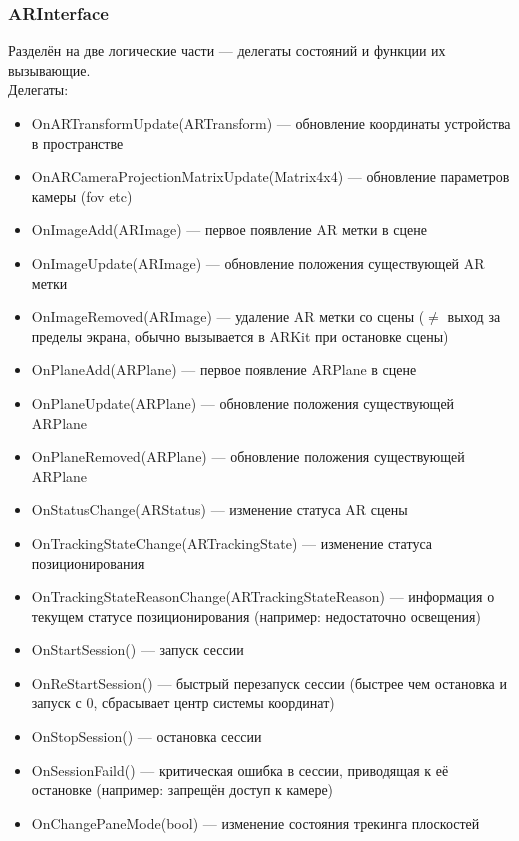 \documentclass[a4paper, 11pt, titlepage]{article}
\begin{document}
      \subsubsection{ARInterface}
        Разделён на две логические части --- делегаты состояний и функции их вызывающие. \\
        Делегаты:
        \begin{itemize}
          \item OnARTransformUpdate(ARTransform) --- обновление координаты устройства в пространстве
          \item OnARCameraProjectionMatrixUpdate(Matrix4x4) --- обновление параметров камеры (fov etc)
          \item OnImageAdd(ARImage) --- первое появление AR метки в сцене 
          \item OnImageUpdate(ARImage) --- обновление положения существующей AR метки
          \item OnImageRemoved(ARImage) --- удаление AR метки со сцены ($\neq$ выход за пределы экрана, обычно вызывается в ARKit при остановке сцены)
          \item OnPlaneAdd(ARPlane) --- первое появление ARPlane в сцене 
          \item OnPlaneUpdate(ARPlane) --- обновление положения существующей ARPlane
          \item OnPlaneRemoved(ARPlane) --- обновление положения существующей ARPlane
          \item OnStatusChange(ARStatus) --- изменение статуса AR сцены 
          \item OnTrackingStateChange(ARTrackingState) --- изменение статуса позиционирования
          \item OnTrackingStateReasonChange(ARTrackingStateReason) --- информация о текущем статусе позиционирования (например: недостаточно освещения)
          \item OnStartSession() --- запуск сессии
          \item OnReStartSession() --- быстрый перезапуск сессии (быстрее чем остановка и запуск с 0, сбрасывает центр системы координат)
          \item OnStopSession() --- остановка сессии
          \item OnSessionFaild() --- критическая ошибка в сессии, приводящая к её остановке (например: запрещён доступ к камере)
          \item OnChangePaneMode(bool) --- изменение состояния трекинга плоскостей 
        \end{itemize}
\end{document}
